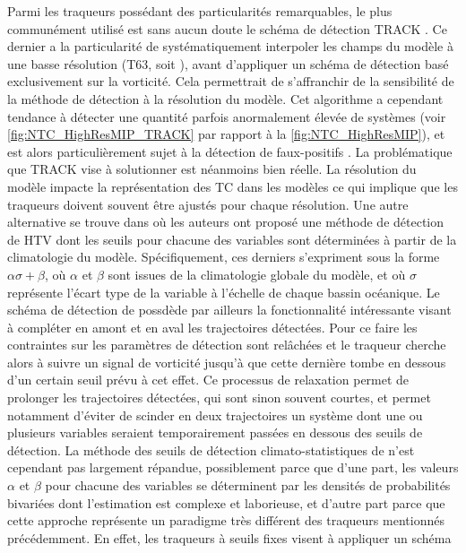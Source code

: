 \documentclass[../main.tex]{subfiles}
\begin{document}
Parmi les traqueurs possédant des particularités remarquables, le plus communément utilisé est sans aucun doute le schéma de détection TRACK
\parencite{hodges_how_2017}. Ce dernier a la particularité de systématiquement interpoler les champs du modèle à une basse résolution (T63, soit ),
avant d'appliquer un schéma de détection basé exclusivement sur la vorticité. Cela permettrait de s'affranchir de la sensibilité de la méthode de détection à la
résolution du modèle. Cet algorithme a cependant tendance à détecter une quantité parfois anormalement élevée de systèmes (voir \cref{fig:NTC_HighResMIP_TRACK}
par rapport à la \cref{fig:NTC_HighResMIP}), et est alors particulièrement sujet à la détection de faux-positifs \parencite{bourdin_intercomparison_2022}. La
problématique que TRACK vise à solutionner est néanmoins bien réelle. La résolution du modèle impacte la représentation des TC dans les modèles ce qui implique
que les traqueurs doivent souvent être ajustés pour chaque résolution. Une autre alternative se trouve dans \textcite{camargo_improving_2002} où les auteurs ont
proposé une méthode de détection de HTV dont les seuils pour chacune des variables sont déterminées à partir de la climatologie du modèle. Spécifiquement, ces
derniers s'expriment sous la forme $\alpha \sigma + \beta$, où $\alpha$ et $\beta$ sont issues de la climatologie globale du modèle, et où $\sigma$ représente
l'écart type de la variable à l'échelle de chaque bassin océanique. Le schéma de détection de \textcite{camargo_improving_2002} possdède par ailleurs la
fonctionnalité intéressante visant à compléter en amont et en aval les trajectoires détectées. Pour ce faire les contraintes sur les paramètres de détection
sont relâchées et le traqueur cherche alors à suivre un signal de vorticité jusqu'à que cette dernière tombe en dessous d'un certain seuil prévu à cet effet. Ce
processus de relaxation permet de prolonger les trajectoires détectées, qui sont sinon souvent courtes, et permet notamment d'éviter de scinder en deux
trajectoires un système dont une ou plusieurs variables seraient temporairement passées en dessous des seuils de détection. La méthode des seuils de détection
climato-statistiques de \textcite{camargo_improving_2002} n'est cependant pas largement répandue, possiblement parce que d'une part, les valeurs $\alpha$ et $\beta$
pour chacune des variables se déterminent par les densités de probabilités bivariées dont l'estimation est complexe et laborieuse, et d'autre part parce que
cette approche représente un paradigme très différent des traqueurs mentionnés précédemment. En effet, les traqueurs à seuils fixes visent à appliquer un schéma
\end{document}
